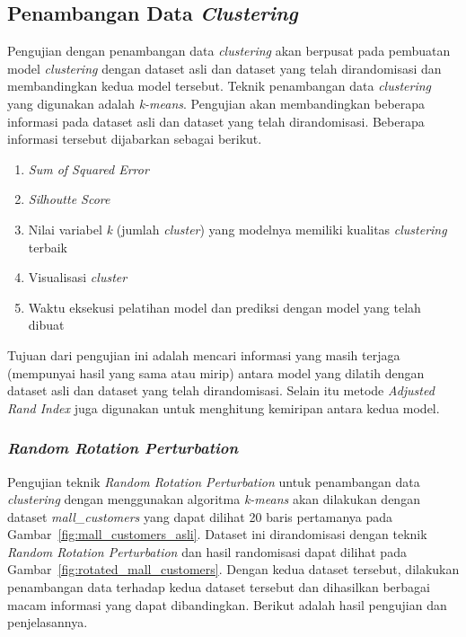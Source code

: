 \subsection{Penambangan Data \textit{Clustering}}
\label{subsec:pengujian-clustering}

Pengujian dengan penambangan data \textit{clustering} akan berpusat pada pembuatan model \textit{clustering} dengan dataset asli dan dataset yang telah dirandomisasi dan membandingkan kedua model tersebut. Teknik penambangan data \textit{clustering} yang digunakan adalah \textit{k-means}. Pengujian akan membandingkan beberapa informasi pada dataset asli dan dataset yang telah dirandomisasi. Beberapa informasi tersebut dijabarkan sebagai berikut.
\begin{enumerate}
	\item \textit{Sum of Squared Error}
	\item \textit{Silhoutte Score}
	\item Nilai variabel \textit{k} (jumlah \textit{cluster}) yang modelnya memiliki kualitas \textit{clustering} terbaik
	\item Visualisasi \textit{cluster}
	\item Waktu eksekusi pelatihan model dan prediksi dengan model yang telah dibuat
\end{enumerate}
Tujuan dari pengujian ini adalah mencari informasi yang masih terjaga (mempunyai hasil yang sama atau mirip) antara model yang dilatih dengan dataset asli dan dataset yang telah dirandomisasi. Selain itu metode \textit{Adjusted Rand Index} juga digunakan untuk menghitung kemiripan antara kedua model.

\subsubsection{\textit{Random Rotation Perturbation}}
\label{subsubsec:pengujian-clustering-rrp}

Pengujian teknik \textit{Random Rotation Perturbation} untuk penambangan data \textit{clustering} dengan menggunakan algoritma \textit{k-means} akan dilakukan dengan dataset \textit{mall\_customers} yang dapat dilihat 20 baris pertamanya pada Gambar~\ref{fig:mall_customers_asli}. Dataset ini dirandomisasi dengan teknik \textit{Random Rotation Perturbation} dan hasil randomisasi dapat dilihat pada Gambar~\ref{fig:rotated_mall_customers}. Dengan kedua dataset tersebut, dilakukan penambangan data terhadap kedua dataset tersebut dan dihasilkan berbagai macam informasi yang dapat dibandingkan. Berikut adalah hasil pengujian dan penjelasannya.

